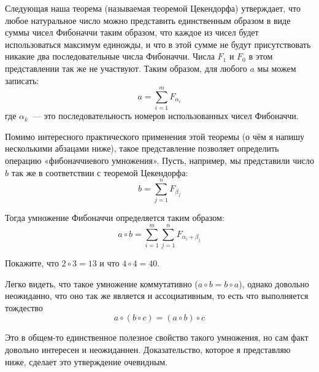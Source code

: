 Следующая наша теорема (называемая теоремой Цекендорфа) утверждает, что любое натуральное число можно представить единственным образом в виде суммы чисел Фибоначчи таким образом, что каждое из чисел будет использоваться максимум единожды, и что в этой сумме не будут присутствовать никакие два последовательные числа Фибоначчи. Числа $F_1$ и $F_0$ в этом представлении так же не участвуют. Таким образом, для любого $a$ мы можем записать:
\begin{equation}\label{non:1}
a = \sum_{i=1}^m F_{\alpha_i}
\end{equation}
где $\alpha_k$~— это последовательность номеров использованных чисел Фибоначчи.

Помимо интересного практического применения этой теоремы (о чём я напишу несколькими абзацами ниже), такое представление позволяет определить операцию «фибоначчиевого умножения». Пусть, например, мы представили число $b$ так же в соответствии с теоремой Цекендорфа:
$$b = \sum_{j=1}^n F_{\beta_j}$$

Тогда умножение Фибоначчи определяется таким образом:
$$a\circ b = \sum_{i=1}^m\sum_{j=1}^n F_{\alpha_i+\beta_j}$$

\begin{exercise}
Покажите, что $2\circ3 = 13$ и что $4\circ4 = 40$.
\end{exercise}

Легко видеть, что такое умножение коммутативно ($a\circ b = b\circ a$), однако довольно неожиданно, что оно так же является и ассоциативным, то есть что выполняется тождество
$$a\circ(b\circ c) = (a\circ b)\circ c$$

Это в общем-то единственное полезное свойство такого умножения, но сам факт довольно интересен и неожиданнен. Доказательство, которое я представляю ниже, сделает это утверждение очевидным.

